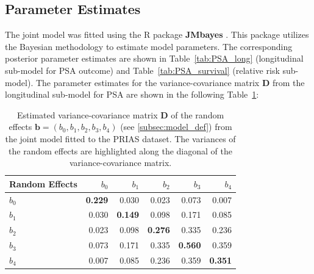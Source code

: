 \subsection{Parameter Estimates}
The joint model was fitted using the R package \textbf{JMbayes} \citep{rizopoulosJMbayes}. This package utilizes the Bayesian methodology to estimate model parameters. The corresponding posterior parameter estimates are shown in Table~\ref{tab:PSA_long} (longitudinal sub-model for PSA outcome) and Table~\ref{tab:PSA_survival} (relative risk sub-model). The parameter estimates for the variance-covariance matrix $\boldsymbol{D}$ from the longitudinal sub-model for PSA are shown in the following Table~\ref{tab:D_matrix}:
\begin{table}[!htb]
\small\sf\centering
\caption{Estimated variance-covariance matrix $\boldsymbol{D}$ of the random effects ${\boldsymbol{b}=(b_{0}, b_{1}, b_{2}, b_{3}, b_{4})}$ (see \ref{subsec:model_def}) from the joint model fitted to the PRIAS dataset. The variances of the random effects are highlighted along the diagonal of the variance-covariance matrix.}
\label{tab:D_matrix}
\begin{tabular}{lrrrrr}
\hline
Random Effects    & $b_{0}$    & $b_{1}$   & $b_{2}$   & $b_{3}$   & $b_{4}$    \\
\hline
$b_{0}$ & \textbf{0.229} & 0.030 & 0.023 & 0.073 & 0.007 \\
$b_{1}$ & 0.030 & \textbf{0.149} & 0.098 & 0.171 & 0.085 \\
$b_{2}$ & 0.023 & 0.098 & \textbf{0.276} & 0.335 & 0.236 \\
$b_{3}$ & 0.073 & 0.171 & 0.335 & \textbf{0.560} & 0.359 \\
$b_{4}$ & 0.007 & 0.085 & 0.236 & 0.359 & \textbf{0.351} \\
\hline
\end{tabular}
\end{table}

